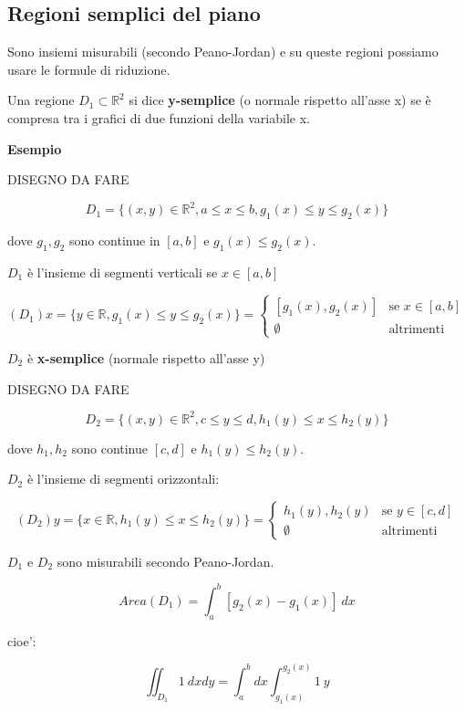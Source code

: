 \documentclass[../appunti-analisi.tex]{subfiles}
\begin{document}
\newpage 

\subsection{Regioni semplici del piano}

Sono insiemi misurabili (secondo Peano-Jordan) e su queste regioni possiamo usare le formule di riduzione.

Una regione $D_1 \subset \mathbb{R}^{2}$ si dice \textbf{y-semplice} (o normale rispetto all'asse x) se è compresa tra i grafici di due funzioni della variabile x.

\textbf{Esempio} 

DISEGNO DA FARE

\[
    D_1= \{(x,y) \in \mathbb{R}^{2}, a \le x \le b, g_1(x) \le y \le g_2(x)\}
\]

dove $g_1,g_2$ sono continue in $[a,b]$ e $g_1(x) \le g_2(x)$.

$D_1$ è l'insieme di segmenti verticali se $x \in [a,b]$

\[
    (D_1)x = \{y \in \mathbb{R}, g_1(x) \le y \le g_2(x)\} = \begin{cases}
        [g_1(x),g_2(x)] & \text{se $x \in [a,b]$} \\
        \emptyset & \text{altrimenti}
    \end{cases}
\]

$D_2$ è \textbf{x-semplice} (normale rispetto all'asse y)

DISEGNO DA FARE


\[
    D_2= \{(x,y) \in \mathbb{R}^{2}, c \le y \le d, h_1(y) \le x \le h_2(y)\}
\]
 
dove $h_1,h_2$ sono continue $[c,d]$ e $h_1(y) \le h_2(y)$.

$D_2$ è l'insieme di segmenti orizzontali:

\[
    (D_2) y = \{x \in \mathbb{R}, h_1(y) \le x \le h_2(y)\} = \begin{cases}
        h_1(y),h_2(y) & \text{se $y \in [c,d]$} \\
        \emptyset & \text{altrimenti}
    \end{cases}
\]


$D_1$ e $D_2$ sono misurabili secondo Peano-Jordan.

\[
    Area(D_1) = \int_{a}^{b} {[g_2(x) -g_1(x)]} \: dx 
\]

cioe':

\[
    \iint_{D_1} {1} \: d x d y = \int_{a}^{b} {dx \int_{g_1(x)}^{g_2(x)} {1} \: y }
\]
\end{document}
